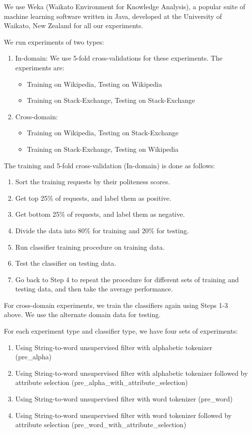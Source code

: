 \documentclass[conference]{IEEEtran}
\begin{document}
We use Weka (Waikato Environment for Knowledge Analysis), a popular suite of machine learning software written in Java, developed at the University of Waikato, New Zealand for all our experiments.

We run experiments of two types:
\begin{enumerate}
\item In-domain:
    We use 5-fold cross-validations for these experiments. The experiments are:
    \begin{itemize}
    \item Training on Wikipedia, Testing on Wikipedia
    \item Training on Stack-Exchange, Testing on Stack-Exchange
    \end{itemize}

\item Cross-domain:
    \begin{itemize}
    \item Training on Wikipedia, Testing on Stack-Exchange
    \item Training on Stack-Exchange, Testing on Wikipedia
    \end{itemize}
\end{enumerate}

The training and 5-fold cross-validation (In-domain) is done as follows:
\begin{enumerate}
\item Sort the training requests by their politeness scores.
\item Get top 25\% of requests, and label them as positive.
\item Get bottom 25\% of requests, and label them as negative.
\item Divide the data into 80\% for training and 20\% for testing.
\item Run classifier training procedure on training data.
\item Test the classifier on testing data.
\item Go back to Step 4 to repeat the procedure for different sets of training and testing data, and then take the average performance.
\end{enumerate}

For cross-domain experiments, we train the classifiers again using Steps 1-3 above. We use the alternate domain data for testing.

For each experiment type and classifier type, we have four sets of experiments:
\begin{enumerate}
\item Using String-to-word unsupervised filter with alphabetic tokenizer (pre\_alpha)
\item Using String-to-word unsupervised filter with alphabetic tokenizer followed by attribute selection (pre\_alpha\_with\_attribute\_selection)
\item Using String-to-word unsupervised filter with word tokenizer (pre\_word)
\item Using String-to-word unsupervised filter with word tokenizer followed by attribute selection (pre\_word\_with\_attribute\_selection)
\end{enumerate}
\end{document}
